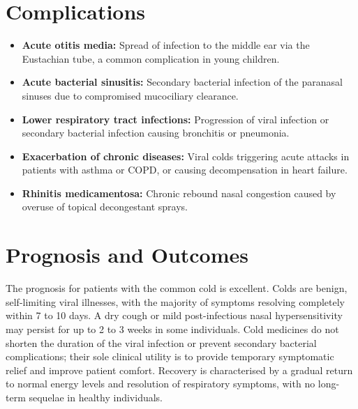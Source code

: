 \section*{Complications}
\begin{itemize}
    \item \textbf{Acute otitis media:} Spread of infection to the middle ear via the Eustachian tube, a common complication in young children.
    \item \textbf{Acute bacterial sinusitis:} Secondary bacterial infection of the paranasal sinuses due to compromised mucociliary clearance.
    \item \textbf{Lower respiratory tract infections:} Progression of viral infection or secondary bacterial infection causing bronchitis or pneumonia.
    \item \textbf{Exacerbation of chronic diseases:} Viral colds triggering acute attacks in patients with asthma or COPD, or causing decompensation in heart failure.
    \item \textbf{Rhinitis medicamentosa:} Chronic rebound nasal congestion caused by overuse of topical decongestant sprays.
\end{itemize}

\section*{Prognosis and Outcomes}
The prognosis for patients with the common cold is excellent. Colds are benign, self-limiting viral illnesses, with the majority of symptoms resolving completely within 7 to 10 days. A dry cough or mild post-infectious nasal hypersensitivity may persist for up to 2 to 3 weeks in some individuals. Cold medicines do not shorten the duration of the viral infection or prevent secondary bacterial complications; their sole clinical utility is to provide temporary symptomatic relief and improve patient comfort. Recovery is characterised by a gradual return to normal energy levels and resolution of respiratory symptoms, with no long-term sequelae in healthy individuals.

